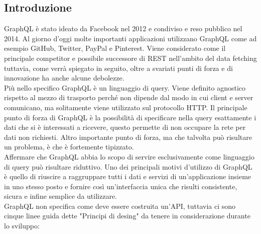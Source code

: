 \subsection{Introduzione}
GraphQL è stato ideato da Facebook nel 2012 e condiviso e reso pubblico nel 2014. Al giorno d'oggi molte importanti applicazioni utilizzano GraphQL come ad esempio GitHub, Twitter, PayPal e Pinterest. Viene considerato come il principale competitor e possibile successore di REST nell'ambito del data fetching tuttavia, come verrà spiegato in seguito, oltre a svariati punti di forza e di innovazione ha anche alcune debolezze.\\
Più nello specifico GraphQL è un linguaggio di query. Viene definito agnostico rispetto al mezzo di trasporto perché non dipende dal modo in cui client e server comunicano, ma solitamente viene utilizzato sul protocollo HTTP. Il principale punto di forza di GraphQL è la possibilità di specificare nella query esattamente i dati che si è interessati a ricevere, questo permette di non occupare la rete per dati non richiesti. Altro importante punto di forza, ma che talvolta può risultare un problema, è che è fortemente tipizzato.\\
Affermare che GraphQL abbia lo scopo di servire esclusivamente come linguaggio di query può risultare riduttivo. Uno dei principali motivi d'utilizzo di GraphQL è quello di riuscire a raggruppare tutti i dati e servizi di un'applicazione insieme in uno stesso posto e fornire così un'interfaccia unica che risulti consistente, sicura e infine semplice da utilizzare.\\
GraphQL non specifica come deve essere costruita un'API, tuttavia ci sono cinque linee guida dette "Principi di desing" da tenere in considerazione durante lo sviluppo:
